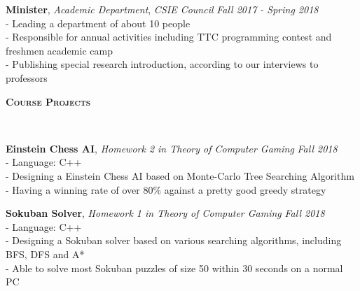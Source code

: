 \documentclass[10pt]{article}
\newenvironment{changemargin}[2]{%
  \begin{list}{}{%
    \setlength{\topsep}{0pt}%
    \setlength{\leftmargin}{#1}%
    \setlength{\rightmargin}{#2}%
    \setlength{\listparindent}{\parindent}%
    \setlength{\itemindent}{\parindent}%
    \setlength{\parsep}{\parskip}%
  }%
  \item[]}{\end{list}
}
\newcommand{\lineover}{
	\begin{changemargin}{-0.05in}{-0.05in}
		\vspace*{-8pt}
		\hrulefill \\
		\vspace*{-2pt}
	\end{changemargin}
}
\newcommand{\header}[1]{
	\begin{changemargin}{-0.5in}{-0.5in}
		\large{\bf \scshape{#1}}\\
  	\lineover
	\end{changemargin}
}
\newenvironment{body} {
	\vspace*{-16pt}
	\begin{changemargin}{-0.25in}{-0.5in}
  }	
	{\end{changemargin}
}
\begin{document}
\begin{body}
	\vspace{14pt}

	\textbf {Minister}, \textit{Academic Department}, \emph{CSIE Council} \hfill \emph{Fall 2017 - Spring 2018}\\
	    \hspace{12pt} - Leading a department of about 10 people\\
	    \hspace{12pt} - Responsible for annual activities including TTC programming contest and freshmen academic camp\\
	    \hspace{12pt} - Publishing special research introduction, according to our interviews to professors\\
	\smallskip
	
\end{body}

\smallskip

\header{Course Projects}

\begin{body}
	\vspace{14pt}

	\textbf {Einstein Chess AI}, \textit{Homework 2 in Theory of Computer Gaming} \hfill \emph{Fall 2018}\\
	\smallskip
        \hspace{12pt} - Language: C++\\
	    \hspace{12pt} - Designing a Einstein Chess AI based on Monte-Carlo Tree Searching Algorithm \\
	    \hspace{12pt} - Having a winning rate of over 80\% against a pretty good greedy strategy \\
	\smallskip

	\textbf {Sokuban Solver}, \textit{Homework 1 in Theory of Computer Gaming} \hfill \emph{Fall 2018}\\
	\smallskip
        \hspace{12pt} - Language: C++\\
		\hspace{12pt} - Designing a Sokuban solver based on various searching algorithms, including BFS, DFS and A*\\
		\hspace{12pt} - Able to solve most Sokuban puzzles of size 50 within 30 seconds on a normal PC
	\smallskip
	
	
\end{body}
\end{document}
